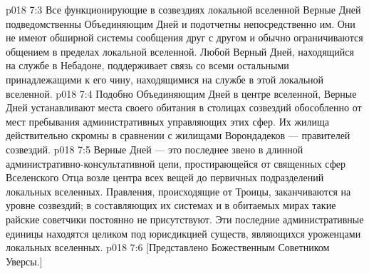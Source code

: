 \vs p018 7:3 Все функционирующие в созвездиях локальной вселенной Верные Дней подведомственны Объединяющим Дней и подотчетны непосредственно им. Они не имеют обширной системы сообщения друг с другом и обычно ограничиваются общением в пределах локальной вселенной. Любой Верный Дней, находящийся на службе в Небадоне, поддерживает связь со всеми остальными принадлежащими к его чину, находящимися на службе в этой локальной вселенной.
\vs p018 7:4 Подобно Объединяющим Дней в центре вселенной, Верные Дней устанавливают места своего обитания в столицах созвездий обособленно от мест пребывания административных управляющих этих сфер. Их жилища действительно скромны в сравнении с жилищами Ворондадеков --- правителей созвездий.
\vs p018 7:5 Верные Дней --- это последнее звено в длинной административно\hyp{}консультативной цепи, простирающейся от священных сфер Вселенского Отца возле центра всех вещей до первичных подразделений локальных вселенных. Правления, происходящие от Троицы, заканчиваются на уровне созвездий; в составляющих их системах и в обитаемых мирах такие райские советчики постоянно не присутствуют. Эти последние административные единицы находятся целиком под юрисдикцией существ, являющихся уроженцами локальных вселенных.
\vsetoff
\vs p018 7:6 [Представлено Божественным Советником Уверсы.]
